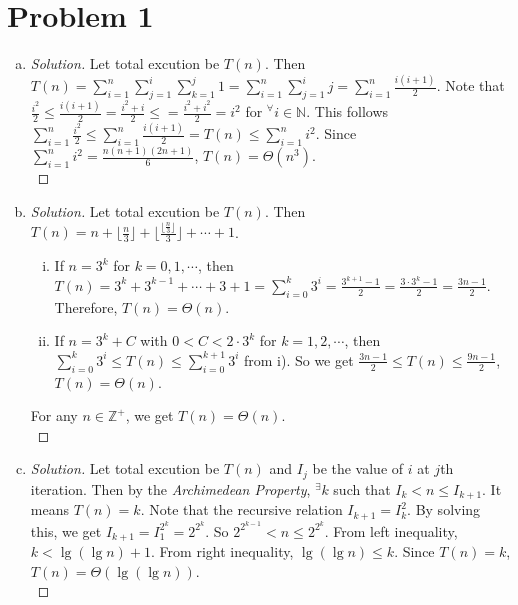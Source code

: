 \section*{Problem 1}
	\begin{enumerate} [(a)]
		\item 
		\begin{proof} [Solution]
			Let total excution be $T(n)$. Then $T(n) = \sum\limits_{i = 1}^n\sum\limits_{j = 1}^i\sum\limits_{k = 1}^j 1 = \sum\limits_{i = 1}^n\sum\limits_{j = 1}^i j = \sum\limits_{i = 1}^n \frac{i(i + 1)}{2}$. Note that $\frac{i^2}{2} \leq \frac{i(i + 1)}{2} = \frac{i^2 + i}{2} \leq = \frac{i^2 + i^2}{2} = i^2$ for $^\forall i \in \mathbb{N}$. This follows $\sum\limits_{i = 1}^n \frac{i^2}{2} \leq \sum\limits_{i = 1}^n\frac{i(i + 1)}{2} = T(n) \leq \sum\limits_{i = 1}^n i^2$. Since $\sum\limits_{i = 1}^n i^2 = \frac{n(n + 1)(2n + 1)}{6}$, $T(n) = \Theta(n^3)$.\\
		\end{proof}
		\item 
		\begin{proof} [Solution]
			Let total excution be $T(n)$. Then $T(n) = n + \lfloor \frac{n}{3} \rfloor + \lfloor \frac{\lfloor \frac{n}{3} \rfloor}{3} \rfloor + \cdots + 1$.
			\begin{enumerate} [i)]
				\item If $n = 3^k$ for $k = 0, 1, \cdots$, then $T(n) = 3^k + 3^{k - 1} + \cdots + 3 + 1 = \sum\limits_{i = 0}^{k} 3^i = \frac{3^{k + 1} - 1}{2} = \frac{3\cdot3^k - 1}{2} = \frac{3n - 1}{2}$. Therefore, $T(n) = \Theta(n)$.
				\item If $n = 3^k + C$ with $0 < C < 2\cdot3^k$ for $k = 1, 2, \cdots$, then $\sum\limits_{i = 0}^{k} 3^i \leq T(n) \leq \sum\limits_{i = 0}^{k + 1} 3^i$ from i). So we get $\frac{3n - 1}{2} \leq T(n) \leq \frac{9n - 1}{2}$, $T(n) = \Theta(n)$.
			\end{enumerate}
			For any $n \in \mathbb{Z}^+$, we get $T(n) = \Theta(n)$.\\
		\end{proof}
		\item 
		\begin{proof} [Solution]
			Let total excution be $T(n)$ and $I_j$ be the value of $i$ at $j$th iteration. Then by the \textit{Archimedean Property}, $^\exists k$ such that $I_k < n \leq I_{k + 1}$. It means $T(n) = k$. Note that the recursive relation $I_{k + 1} = I_k^2$. By solving this, we get $I_{k + 1} = I_1^{2^{k}} = 2^{2^{k}}$. So $2^{2^{k - 1}} < n \leq 2^{2^{k}}$. From left inequality, $k < \lg{(\lg n)} + 1$. From right inequality, $\lg{(\lg n)} \leq k$. Since $T(n) = k$, $T(n) = \Theta(\lg{(\lg n)})$.\\
		\end{proof}
	\end{enumerate}